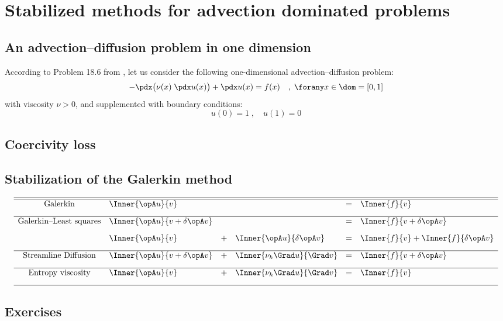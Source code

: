 
\chapter{Stabilized methods for advection dominated problems}

\section{An advection--diffusion problem in one dimension}

According to Problem 18.6 from \cite{CDE}, let us consider the following one-dimensional advection--diffusion problem:
\begin{equation*}
- \pdx\bigl(\nu(x)\;\pdx u(x)\bigr) + \pdx u(x) = f(x)\quad,\;\forany x\in \dom = [0,1]
\end{equation*}
with viscosity $\nu > 0$, and supplemented with boundary conditions:
\begin{equation*}
u(0) = 1\;,\quad u(1) = 0
\end{equation*}

\section{Coercivity loss}

\section{Stabilization of the Galerkin method}\label{ssec:stab_galerkin}

\begin{equation*}
\begin{array}{clllll}
\hline
\hline
\mbox{Galerkin}& \Inner{\opA u}{v} && &=& \Inner{f}{v} \\[2ex]

\hline
\mbox{Galerkin--Least squares}& \Inner{\opA u}{v + \delta \opA v} &&&=& \Inner{f}{v + \delta \opA v} \\[2ex]
& \Inner{\opA u}{v} &+& \Inner{\opA u}{\delta \opA v} &=& \Inner{f}{v} + \Inner{f}{\delta \opA v} \\[2ex]

\hline
\mbox{Streamline Diffusion}& \Inner{\opA u}{v + \delta \opA v} &+& \Inner{\nu_h \Grad u}{\Grad v} &=& \Inner{f}{v + \delta \opA v} \\[2ex]

\hline
\mbox{Entropy viscosity}& \Inner{\opA u}{v} &+& \Inner{\nu_h \Grad u}{\Grad v} &=& \Inner{f}{v} \\[2ex]
\hline
\end{array}
\end{equation*}

\section{Exercises}
